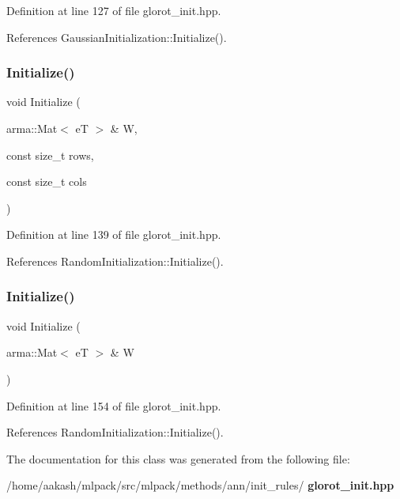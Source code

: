 Definition at line 127 of file glorot\+\_\+init.\+hpp.



References Gaussian\+Initialization\+::\+Initialize().

\mbox{\label{classmlpack_1_1ann_1_1GlorotInitializationType_a8a614fcc8aeff6f47c9f608762411e2a}} 
\subsubsection{Initialize()\hspace{0.1cm}{\footnotesize\ttfamily [7/8]}}
{\footnotesize\ttfamily void Initialize (\begin{DoxyParamCaption}\item[{arma\+::\+Mat$<$ eT $>$ \&}]{W,  }\item[{const size\+\_\+t}]{rows,  }\item[{const size\+\_\+t}]{cols }\end{DoxyParamCaption})\hspace{0.3cm}{\ttfamily [inline]}}



Definition at line 139 of file glorot\+\_\+init.\+hpp.



References Random\+Initialization\+::\+Initialize().

\mbox{\label{classmlpack_1_1ann_1_1GlorotInitializationType_a24da1718009511401802942918bd3261}} 
\subsubsection{Initialize()\hspace{0.1cm}{\footnotesize\ttfamily [8/8]}}
{\footnotesize\ttfamily void Initialize (\begin{DoxyParamCaption}\item[{arma\+::\+Mat$<$ eT $>$ \&}]{W }\end{DoxyParamCaption})\hspace{0.3cm}{\ttfamily [inline]}}



Definition at line 154 of file glorot\+\_\+init.\+hpp.



References Random\+Initialization\+::\+Initialize().



The documentation for this class was generated from the following file\+:\begin{DoxyCompactItemize}
\item 
/home/aakash/mlpack/src/mlpack/methods/ann/init\+\_\+rules/\textbf{ glorot\+\_\+init.\+hpp}\end{DoxyCompactItemize}
